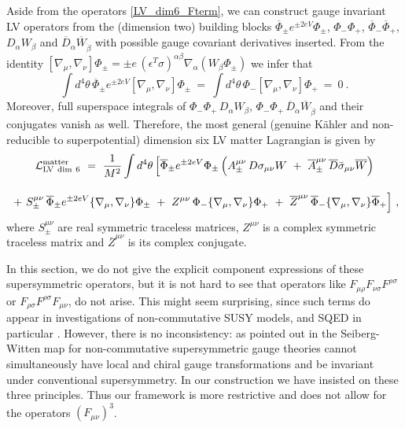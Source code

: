 \documentclass[12pt]{revtex4}
\begin{document}
Aside from the operators \eqref{LV_dim6_Fterm}, we can 
construct gauge invariant LV operators from the (dimension two)
building blocks  
$\overline{\Phi}_\pm e^{\pm 2e V} \Phi_\pm$, $\Phi_- \Phi_+$, 
$\overline{\Phi}_- \overline{\Phi}_+$, $D_\alpha W_\beta$ and
$\overline{D}_{\dot\alpha} \overline{W}_{\dot\beta}$ with possible
gauge covariant derivatives inserted. From the identity 
\(
[ \nabla_\mu, \nabla_\nu] \Phi_\pm = \pm e \, 
(\epsilon^T \sigma)^{\alpha\beta} \nabla_\alpha( W_\beta \Phi_\pm)
\)
we infer that 
%
\begin{equation}
\int d^4\theta\, \overline{\Phi}_\pm e^{\pm 2eV} 
[ \nabla_\mu, \nabla_\nu] \Phi_\pm  
~=~ \int d^4\theta\, \Phi_- [ \nabla_\mu, \nabla_\nu] \Phi_+ ~=~ 0~. 
\end{equation} 
%
Moreover, full superspace integrals of 
$\Phi_- \Phi_+\, D_\alpha W_\beta$, 
$\Phi_- \Phi_+\, \overline{D}_{\dot\alpha} \overline{W}_{\dot\beta}$ 
and their conjugates vanish as well. Therefore, the most general
(genuine K\"ahler and non-reducible to superpotential) dimension six
LV matter Lagrangian is given by  
%
\begin{gather}
{\cal L}_{\rm LV\ dim\ 6}^{\rm matter}  ~=~ \frac{1}{M^2}
\int d^4 \theta\, \Big[ 
\overline{\Phi}_\pm e^{\pm 2eV} \Phi_\pm \, 
\Big( 
A_\pm^{\mu\nu} \, D \sigma_{\mu\nu} W ~+~ 
\overline{A}_\pm^{\mu\nu} \, \overline{D} \bar\sigma_{\mu\nu} \overline{W}
\Big) 
\nonumber \\[2ex]
~+~ S_\pm^{\mu\nu}\,  \overline{\Phi}_\pm e^{\pm 2eV} 
\lbrace \nabla_\mu, \nabla_\nu \rbrace \Phi_\pm  
~+~ Z^{\mu\nu}\,  \Phi_- \lbrace \nabla_\mu, \nabla_\nu \rbrace \Phi_+ 
~+~ \overline{Z}^{\mu\nu}\,  
\overline{\Phi}_- \lbrace \nabla_\mu, \nabla_\nu \rbrace \overline{\Phi}_+ 
 \Big]~, 
 \label{LV_dim6_Dterm}
\end{gather}
%
where $S_\pm^{\mu\nu}$ are real symmetric traceless matrices, 
$Z^{\mu\nu}$ is a complex symmetric traceless matrix and
$\overline{Z}^{\mu\nu}$ is its complex conjugate. 


In this section, we do not give the explicit component expressions of
these supersymmetric operators, but it is not hard to see that
operators like  $ F_{\mu\rho}F_{\nu\sigma}F^{\rho\sigma} $
or $ F_{\rho\sigma}F^{\rho\sigma}F_{\mu\nu} $, 
do not arise. This might seem surprising, since such terms do appear
in investigations of non-commutative SUSY models, and SQED in
particular \cite{Putz:2002ib,Mikulovic:2003sq}. However, there is no
inconsistency: as pointed out in \cite{Mikulovic:2003sq} the
Seiberg-Witten map for non-commutative supersymmetric gauge 
theories cannot simultaneously have local and chiral gauge
transformations and be invariant under conventional supersymmetry. 
In our construction we have insisted on these three
principles. 
Thus our framework is more restrictive and does not allow 
for the operators $ (F_{\mu\nu})^3 $. 
\end{document}
